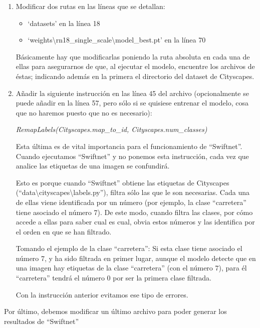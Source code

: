 \begin{enumerate}
\item Modificar dos rutas en las líneas que se detallan:
\begin{itemize}
\item `datasets' en la línea 18
\item `weights\textbackslash{rn18\_single\_scale}\textbackslash{model\_best.pt}' en la línea 70
\end{itemize}

Básicamente hay que modificarlas poniendo la ruta absoluta en cada una de ellas para asegurarnos de que, al ejecutar el modelo, encuentre los archivos de éstas; indicando además en la primera el directorio del dataset de Cityscapes.

\item Añadir la siguiente instrucción en las línea 45 del archivo (opcionalmente se puede añadir en la línea 57, pero sólo si se quisiese entrenar el modelo, cosa que no haremos puesto que no es necesario):

\begin{center}
\textit{RemapLabels(Cityscapes.map\_to\_id, Cityscapes.num\_classes)}
\end{center}

Esta última es de vital importancia para el funcionamiento de ``Swiftnet''. Cuando ejecutamos ``Swiftnet'' y no ponemos esta instrucción, cada vez que analice las etiquetas de una imagen se confundirá.

Esto es porque cuando ``Swiftnet'' obtiene las etiquetas de Cityscapes (``data\textbackslash{cityscapes}\textbackslash{labels.py}''), filtra sólo las que le son necesarias. Cada una de ellas viene identificada por un número (por ejemplo, la clase ``carretera'' tiene asociado el número 7). De este modo, cuando filtra las clases, por cómo accede a ellas para saber cual es cual, obvia estos números y las identifica por el orden en que se han filtrado.

Tomando el ejemplo de la clase ``carretera'': Si esta clase tiene asociado el número 7, y ha sido filtrada en primer lugar, aunque el modelo detecte que en una imagen hay etiquetas de la clase ``carretera'' (con el número 7), para él ``carretera'' tendrá el número 0 por ser la primera clase filtrada.

Con la instrucción anterior evitamos ese tipo de errores.
\end{enumerate}

Por último, debemos modificar un último archivo para poder generar los resultados de ``Swiftnet''

